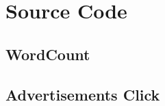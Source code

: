 \section{Source Code\label{LiiteA}}
\subsection{WordCount}
\subsection{Advertisements Click}

\clearpage


